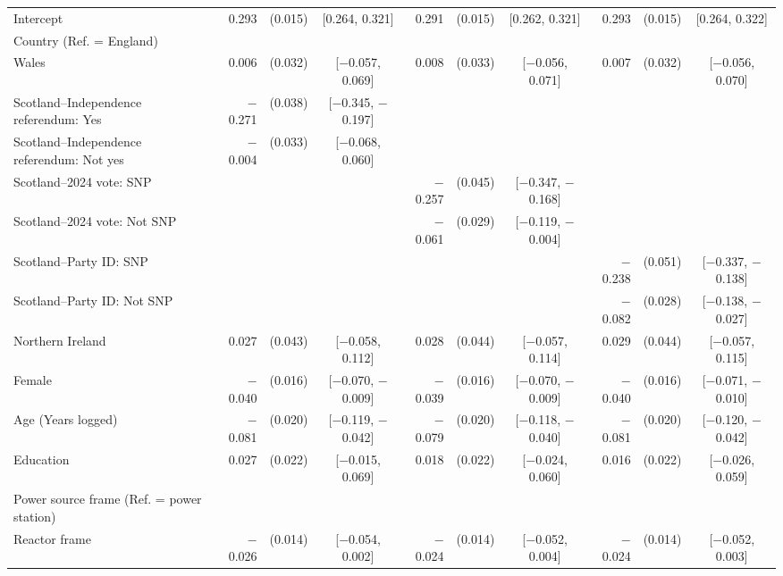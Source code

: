 \begin{landscape}
\begin{longtable}[t]{>{\raggedright\arraybackslash}p{2.8in}rrcrrcrrc}
\endfoot
\bottomrule
\endlastfoot
Intercept & 0.293 & (0.015) & {}[0.264, 0.321] & 0.291 & (0.015) & {}[0.262, 0.321] & 0.293 & (0.015) & {}[0.264, 0.322]\\
Country (Ref. = England) &  &  &  &  &  &  &  &  & \\
\hspace{1em}Wales & 0.006 & (0.032) & {}[$-$0.057, 0.069] & 0.008 & (0.033) & {}[$-$0.056, 0.071] & 0.007 & (0.032) & {}[$-$0.056, 0.070]\\
\hspace{1em}Scotland--Independence referendum: Yes & $-$0.271 & (0.038) & {}[$-$0.345, $-$0.197] &  &  &  &  &  & \\
\hspace{1em}Scotland--Independence referendum: Not yes & $-$0.004 & (0.033) & {}[$-$0.068, 0.060] &  &  &  &  &  & \\
\hspace{1em}Scotland--2024 vote: SNP &  &  &  & $-$0.257 & (0.045) & {}[$-$0.347, $-$0.168] &  &  & \\
\hspace{1em}Scotland--2024 vote: Not SNP &  &  &  & $-$0.061 & (0.029) & {}[$-$0.119, $-$0.004] &  &  & \\
\hspace{1em}Scotland--Party ID: SNP &  &  &  &  &  &  & $-$0.238 & (0.051) & {}[$-$0.337, $-$0.138]\\
\hspace{1em}Scotland--Party ID: Not SNP &  &  &  &  &  &  & $-$0.082 & (0.028) & {}[$-$0.138, $-$0.027]\\
\hspace{1em}Northern Ireland & 0.027 & (0.043) & {}[$-$0.058, 0.112] & 0.028 & (0.044) & {}[$-$0.057, 0.114] & 0.029 & (0.044) & {}[$-$0.057, 0.115]\\
Female & $-$0.040 & (0.016) & {}[$-$0.070, $-$0.009] & $-$0.039 & (0.016) & {}[$-$0.070, $-$0.009] & $-$0.040 & (0.016) & {}[$-$0.071, $-$0.010]\\
Age (Years logged) & $-$0.081 & (0.020) & {}[$-$0.119, $-$0.042] & $-$0.079 & (0.020) & {}[$-$0.118, $-$0.040] & $-$0.081 & (0.020) & {}[$-$0.120, $-$0.042]\\
Education & 0.027 & (0.022) & {}[$-$0.015, 0.069] & 0.018 & (0.022) & {}[$-$0.024, 0.060] & 0.016 & (0.022) & {}[$-$0.026, 0.059]\\
Power source frame (Ref. = power station) &  &  &  &  &  &  &  &  & \\
\hspace{1em}Reactor frame & $-$0.026 & (0.014) & {}[$-$0.054, 0.002] & $-$0.024 & (0.014) & {}[$-$0.052, 0.004] & $-$0.024 & (0.014) & {}[$-$0.052, 0.003]\\

\end{longtable}
\end{landscape}
